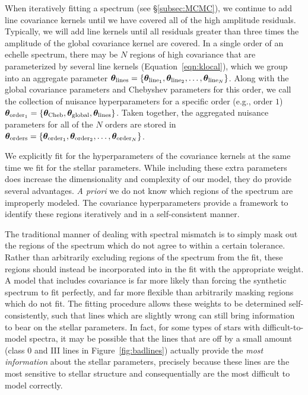 \documentclass[iop,floatfix]{emulateapj}
\newcommand{\vt}{ {\bm \theta}}
\newcommand{\vtcheb}{\vt_{\rm Cheb}}
\newcommand{\vtglobal}{\vt_{\rm global}}
\newcommand{\vtorder}[1]{\vt_{{\rm order}_{#1}}}
\newcommand{\vtorders}{\vt_{\rm orders}}
\newcommand{\vtline}[1]{\vt_{{\rm line}_{#1}}}
\newcommand{\vtlines}{\vt_{\rm lines}}
\begin{document}
When iteratively fitting a spectrum (see \S\ref{subsec:MCMC}), we continue to add line covariance kernels until we have covered all of the high amplitude residuals. Typically, we will add line kernels until all residuals greater than three times the amplitude of the global covariance kernel are covered. In a single order of an echelle spectrum, there may be $N$ regions of high covariance that are parameterized by several line kernels (Equation~\ref{eqn:klocal}), which we group into an aggregate parameter $\vtlines = \{\vtline{1}, \vtline{2}, \ldots, \vtline{N}\}$. Along with the global covariance parameters and Chebyshev parameters for this order, we call the collection of nuisance hyperparameters for a specific order  (e.g., order $1$) $\vtorder{1} = \{\vtcheb, \vtglobal, \vtlines\}$. Taken together, the aggregated nuisance parameters for all of the $N$ orders are stored in $\vtorders = \{\vtorder{1}, \vtorder{2}, \ldots, \vtorder{N} \}$.

 We explicitly fit for the
hyperparameters of the covariance kernels at the same time we fit for the
stellar parameters. While including these extra parameters does increase the
dimensionality and complexity of our model, they do provide several advantages.
\emph{A priori} we do not know which regions of the spectrum are improperly
modeled. The covariance hyperparameters provide a framework to identify these
regions iteratively and in a self-consistent manner. 

The traditional manner of dealing with spectral mismatch is to simply mask out the regions of the spectrum which do not agree to within a certain tolerance.  Rather than arbitrarily excluding regions of the spectrum from the fit, these regions should instead be incorporated into in the fit with the appropriate weight. A model that includes covariance is far more likely than forcing the synthetic spectrum to fit perfectly, and far more flexible than arbitrarily masking regions which do not fit. The fitting procedure allows these weights to be determined self-consistently, such that lines which are slightly wrong can still bring information to bear on the stellar parameters. In fact, for some types of stars with difficult-to-model spectra, it may be possible that the lines that are off by a small amount (class 0 and III lines in Figure~\ref{fig:badlines}) actually provide the \emph{most information} about the stellar parameters, precisely because these lines are the most sensitive to stellar structure and consequentially are the most difficult to model correctly.
\end{document}
